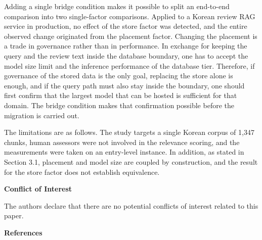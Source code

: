 \documentclass[10pt,a4paper,twocolumn]{article}
\newcommand{\pgsec}[1]{\par\vspace{5pt}{\bfseries\fontsize{12}{14}\selectfont #1}\par\nobreak\vspace{2pt}\nobreak}
\newcommand{\pgspecial}[1]{\par\vspace{5pt}\begin{center}{\bfseries\fontsize{12}{14}\selectfont #1}\end{center}\vspace{2pt}}
\begin{document}
\pgsec{4. Conclusion}

Adding a single bridge condition makes it possible to split an end-to-end comparison into two single-factor comparisons. Applied to a Korean review RAG service in production, no effect of the store factor was detected, and the entire observed change originated from the placement factor. Changing the placement is a trade in governance rather than in performance. In exchange for keeping the query and the review text inside the database boundary, one has to accept the model size limit and the inference performance of the database tier. Therefore, if governance of the stored data is the only goal, replacing the store alone is enough, and if the query path must also stay inside the boundary, one should first confirm that the largest model that can be hosted is sufficient for that domain. The bridge condition makes that confirmation possible before the migration is carried out.

The limitations are as follows. The study targets a single Korean corpus of 1,347 chunks, human assessors were not involved in the relevance scoring, and the measurements were taken on an entry-level instance. In addition, as stated in Section 3.1, placement and model size are coupled by construction, and the result for the store factor does not establish equivalence.

\pgspecial{Conflict of Interest}

The authors declare that there are no potential conflicts of interest related to this paper.

\pgspecial{References}
\end{document}
